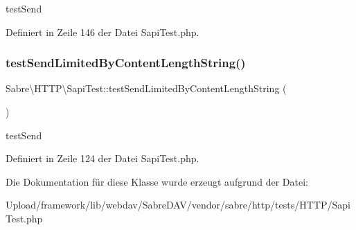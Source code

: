 test\+Send 

Definiert in Zeile 146 der Datei Sapi\+Test.\+php.

\mbox{\label{class_sabre_1_1_h_t_t_p_1_1_sapi_test_a36200c0bb1367c40255bf13ac9dbbdc6}} 
\subsubsection{\texorpdfstring{test\+Send\+Limited\+By\+Content\+Length\+String()}{testSendLimitedByContentLengthString()}}
{\footnotesize\ttfamily Sabre\textbackslash{}\+H\+T\+T\+P\textbackslash{}\+Sapi\+Test\+::test\+Send\+Limited\+By\+Content\+Length\+String (\begin{DoxyParamCaption}{ }\end{DoxyParamCaption})}

test\+Send 

Definiert in Zeile 124 der Datei Sapi\+Test.\+php.



Die Dokumentation für diese Klasse wurde erzeugt aufgrund der Datei\+:\begin{DoxyCompactItemize}
\item 
Upload/framework/lib/webdav/\+Sabre\+D\+A\+V/vendor/sabre/http/tests/\+H\+T\+T\+P/Sapi\+Test.\+php\end{DoxyCompactItemize}
